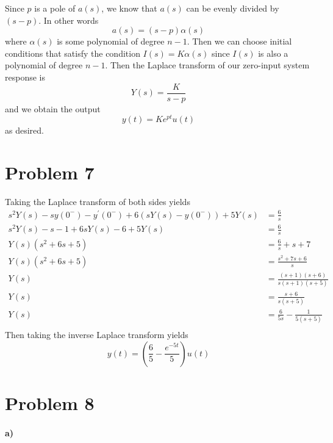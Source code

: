 \documentclass[12pt]{article}
\begin{document}
Since \(p\) is a pole of \(a(s)\), we know that \(a(s)\) can be evenly divided by \((s-p)\). In other words
\[a(s)=(s-p)\alpha(s)\]
where \(\alpha(s)\) is some polynomial of degree \(n-1\). Then we can choose initial conditions that satisfy the
condition \(I(s)=K\alpha(s)\) since \(I(s)\) is also a polynomial of degree \(n-1\). Then the Laplace transform
of our zero-input system response is
\[Y(s)=\frac{K}{s-p}\]
and we obtain the output
\[y(t)=Ke^{pt}u(t)\]
as desired.

\section*{Problem 7}

Taking the Laplace transform of both sides yields
\begin{align*}
    s^2Y(s)-sy(0^-)-y^\prime(0^-) + 6(sY(s) - y(0^-)) + 5Y(s) &= \frac{6}{s}\\
    s^2Y(s)-s-1+6sY(s)-6+5Y(s) &= \frac{6}{s}\\
    Y(s)(s^2+6s+5) &= \frac{6}{s}+s+7\\
    Y(s)(s^2+6s+5) &= \frac{s^2+7s+6}{s}\\
    Y(s) &= \frac{(s+1)(s+6)}{s(s+1)(s+5)}\\
    Y(s) &= \frac{s+6}{s(s+5)}\\
    Y(s) &= \frac{6}{5s} - \frac{1}{5(s+5)}\\
\end{align*}
Then taking the inverse Laplace transform yields
\[y(t) = \left(\frac{6}{5} - \frac{e^{-5t}}{5}\right) u(t)\]

\section*{Problem 8}

\paragraph{a)}
\end{document}

